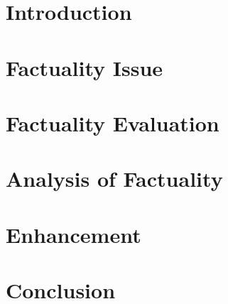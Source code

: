\documentclass[manuscript,screen,acmsmall]{acmart}
\begin{document}
\maketitle

\section{Introduction}

% 



\section{Factuality Issue}
\label{sec:the_issue}



\section{Factuality Evaluation}
\label{sec:evalution}



\section{Analysis of Factuality}
\label{sec:analysis}




\section{Enhancement}
\label{sec:enhancement}






\section{Conclusion}


\end{document}
